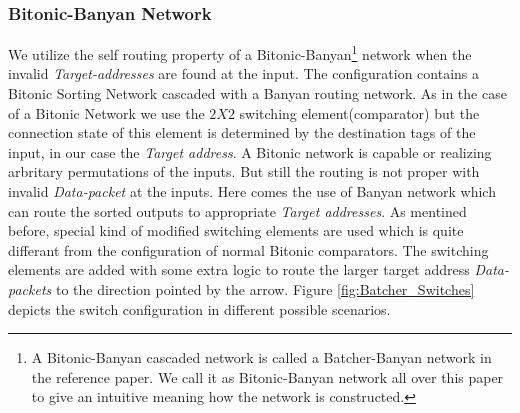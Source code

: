 				  \subsubsection{Bitonic-Banyan Network}
					      We utilize the self routing property of a Bitonic-Banyan\footnote{A Bitonic-Banyan cascaded network is called a Batcher-Banyan network in the reference paper\cite{batcher_banyan_ref}.
					      We call it as Bitonic-Banyan  network all over this paper to give an intuitive meaning how the network is constructed.} network \cite{batcher_banyan_ref} when the invalid 
					      \textit{Target-addresses} are found at the input. The configuration contains
					      a Bitonic Sorting Network cascaded with a Banyan routing network. As in the case of a Bitonic Network we use the $2 X 2$ switching element(comparator) but the connection state of this
					      element is determined by the destination tags of the input, in our case the \textit{Target address}. A Bitonic network is capable or realizing arbritary permutations of the inputs. 
					      But still the routing is not proper with invalid \textit{Data-packet} at the inputs. Here comes the use of Banyan network which can route the sorted outputs to appropriate
					      \textit{Target addresses}. As mentined before, special kind of modified switching elements are used which is quite differant from the configuration of normal Bitonic comparators.
					      The switching elements are added with some extra logic to route the larger target address \textit{Data-packets} to the direction pointed by the arrow. 
					      Figure \ref{fig:Batcher_Switches} depicts the switch configuration in different possible scenarios. 
					      
